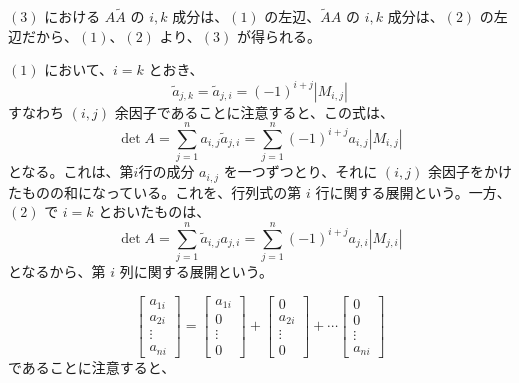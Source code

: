 $(3)$ における $A\widetilde{A}$ の $i,k$ 成分は、$(1)$ の左辺、$\widetilde{A}A$ の $i,k$ 成分は、$(2)$ の左辺だから、$(1)$、$(2)$ より、$(3)$ が得られる。

\smallskip
$(1)$ において、$i = k$ とおき、
$$\tilde{a}_{j,k} = \tilde{a}_{j,i} = (-1)^{i+j}|M_{i,j}|$$
すなわち $(i,j)$ 余因子であることに注意すると、この式は、
$$\det A = \sum_{j = 1}^na_{i,j}\tilde{a}_{j,i}
 =  \sum_{j = 1}^n(-1)^{i+j}a_{i,j}|M_{i,j}|$$
となる。これは、第$i$行の成分 $a_{i,j}$ を一つずつとり、それに $(i,j)$ 余因子をかけたものの和になっている。これを、行列式の第 $i$ 行に関する展開という。一方、$(2)$ で $i = k$ とおいたものは、
$$\det A = \sum_{j = 1}^n\tilde{a}_{i,j}a_{j,i}
= \sum_{j = 1}^n(-1)^{i+j}a_{j,i}|M_{j,i}|$$
となるから、第 $i$ 列に関する展開という。

\smallskip
$$\left[\begin{array}{c}a_{1i}\\a_{2i}\\ \vdots \\a_{ni}\end{array}\right] = 
\left[\begin{array}{c}a_{1i}\\0\\ \vdots \\0\end{array}\right] + 
\left[\begin{array}{c}0\\a_{2i}\\ \vdots \\0\end{array}\right] + \cdots
\left[\begin{array}{c}0\\0\\ \vdots \\a_{ni}\end{array}\right]$$
であることに注意すると、
